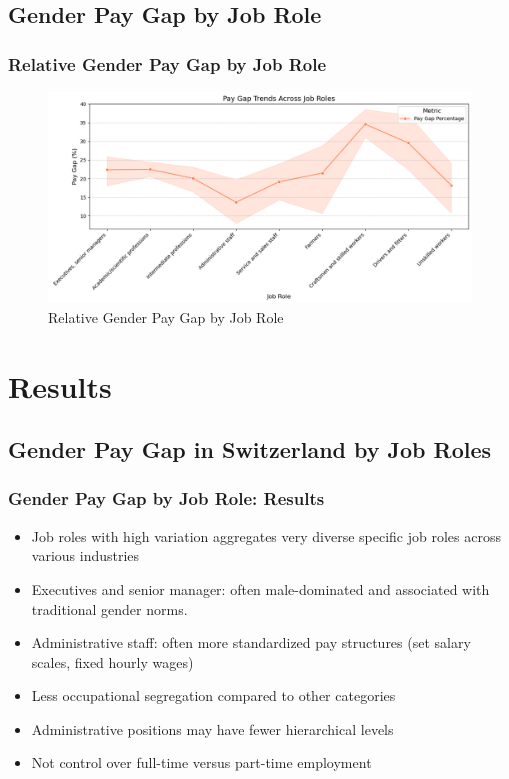 \documentclass{beamer}
\begin{document}
\subsection{Gender Pay Gap by Job Role}
\begin{frame}
\frametitle{Relative Gender Pay Gap by Job Role}
\begin{center}
\begin{figure}[H]
    \includegraphics[width=\textwidth]{Figures/Pay_Gap_Trends_by_Job_Role.png}
    \caption{Relative Gender Pay Gap by Job Role}
    \label{fig:relative_gap_roles}
\end{figure}
\end{center}
\end{frame}

\section{Results}
\subsection{Gender Pay Gap in Switzerland by Job Roles}

\begin{frame}
\frametitle{Gender Pay Gap by Job Role: Results}
\begin{center}
  \begin{itemize}
    \item Job roles with high variation aggregates very diverse specific job roles across
various industries
    \item Executives and senior manager: often male-dominated and associated with traditional gender norms.
    \item Administrative staff: often more standardized pay structures (set salary scales, fixed hourly wages)
    \item Less occupational segregation compared to other categories
    \item Administrative positions may have fewer hierarchical levels
    \item Not control over full-time versus part-time employment
\end{itemize} 
\end{center}
\end{frame}
\end{document}
